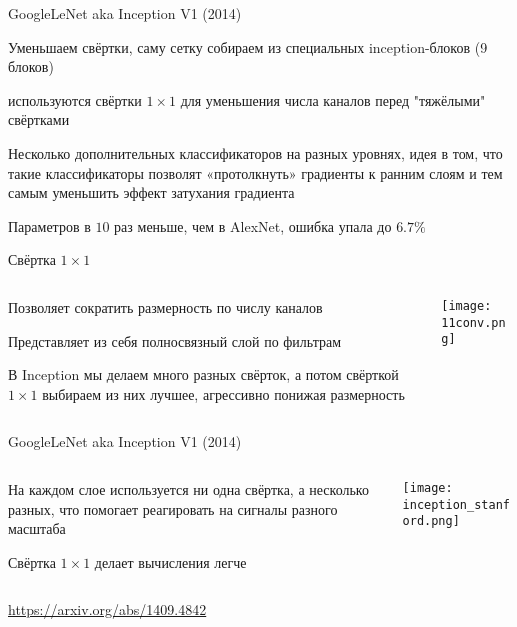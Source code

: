 \documentclass[notes,12pt, aspectratio=169]{beamer}
\newenvironment{wideitemize}{\itemize\addtolength{\itemsep}{10pt}}{\enditemize}
\begin{document}
\begin{frame}{GoogleLeNet aka Inception V1  (2014)}
\begin{wideitemize}
	\item  Уменьшаем свёртки, саму \alert{сетку собираем из специальных inception-блоков}  (9 блоков)
		
	\item используются  \alert{свёртки $1 \times 1$} для уменьшения числа каналов перед "тяжёлыми" свёртками 
	
	\item \alert{Несколько дополнительных классификаторов на разных уровнях,} идея в том, что такие классификаторы позволят «протолкнуть» градиенты к ранним слоям и тем самым уменьшить эффект затухания градиента
	
	\item  Параметров  в $10$ раз меньше, чем в AlexNet, ошибка упала до $6.7\%$
\end{wideitemize}
\end{frame}


\begin{frame}{Свёртка $1 \times 1$}
\begin{columns}[T] %
	\begin{column}{.4\textwidth}
		\begin{wideitemize}
			\item  Позволяет сократить размерность по числу каналов
			\item  Представляет из себя полносвязный слой по фильтрам 
			\item  В Inception мы делаем много разных свёрток, а потом свёрткой $1 \times 1$ выбираем из них лучшее, агрессивно понижая размерность
		\end{wideitemize}
	\end{column}%
	\hfill%
	\begin{column}{.6\textwidth}
		\texttt{[image: 11conv.png]}
	\end{column}%
\end{columns}
\end{frame}


\begin{frame}{GoogleLeNet aka Inception V1  (2014)}
\begin{columns}[T] %
	\begin{column}{.4\textwidth}
		\begin{wideitemize}	
			\item  На каждом слое используется ни одна свёртка, а несколько разных, что помогает реагировать на сигналы разного масштаба
			\item Свёртка $1 \times 1$ делает вычисления легче
		\end{wideitemize}
	\end{column}%
	\hfill%
	\begin{column}{.6\textwidth}
		\begin{center}
			\texttt{[image: inception\_stanford.png]}
		\end{center}
	\end{column}%
\end{columns}
\vfill %
\footnotesize
\color{blue} \url{https://arxiv.org/abs/1409.4842}
\end{frame}
\end{document}
